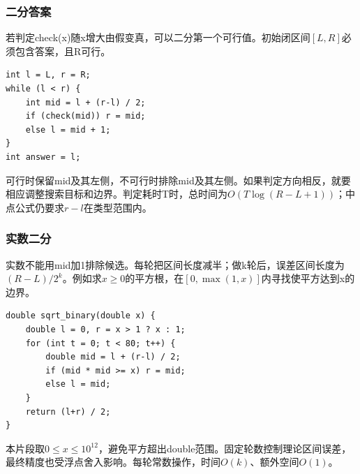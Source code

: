 \documentclass[UTF8,11pt,a4paper,fontset=none]{ctexart}
\begin{document}
\subsubsection{二分答案}
若判定check(x)随x增大由假变真，可以二分第一个可行值。初始闭区间$[L,R]$必须包含答案，且R可行。
\par\noindent\begin{minipage}{\linewidth}
\begin{lstlisting}
int l = L, r = R;
while (l < r) {
    int mid = l + (r-l) / 2;
    if (check(mid)) r = mid;
    else l = mid + 1;
}
int answer = l;
\end{lstlisting}
\end{minipage}\par
可行时保留mid及其左侧，不可行时排除mid及其左侧。如果判定方向相反，就要相应调整搜索目标和边界。判定耗时T时，总时间为$O(T\log(R-L+1))$；中点公式仍要求$r-l$在类型范围内。

\subsubsection{实数二分}
实数不能用mid加1排除候选。每轮把区间长度减半；做k轮后，误差区间长度为$(R-L)/2^k$。例如求$x\ge0$的平方根，在$[0,\max(1,x)]$内寻找使平方达到x的边界。
\par\noindent\begin{minipage}{\linewidth}
\begin{lstlisting}
double sqrt_binary(double x) {
    double l = 0, r = x > 1 ? x : 1;
    for (int t = 0; t < 80; t++) {
        double mid = l + (r-l) / 2;
        if (mid * mid >= x) r = mid;
        else l = mid;
    }
    return (l+r) / 2;
}
\end{lstlisting}
\end{minipage}\par
本片段取$0\le x\le10^{12}$，避免平方超出double范围。固定轮数控制理论区间误差，最终精度也受浮点舍入影响。每轮常数操作，时间$O(k)$、额外空间$O(1)$。
\end{document}
